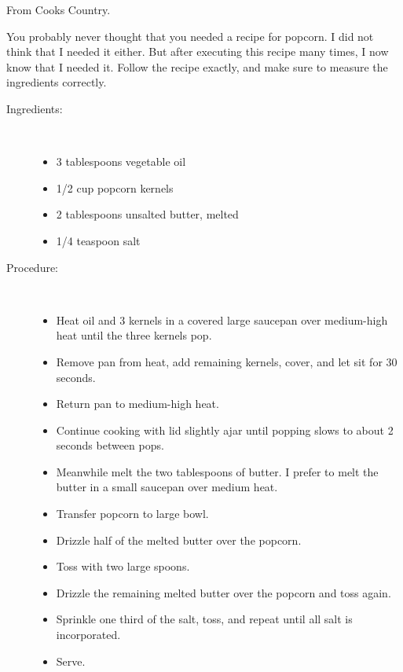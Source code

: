 \documentclass[11pt,letterpaper]{article}
\begin{document}


\begin{flushright}
{\hspace{4in} From Cooks Country.}
\end{flushright}
\vspace{0.5in}

You probably never thought that you needed a recipe for popcorn. I did not think that I needed it either. But after executing this recipe many times, I now know that I needed it. Follow the recipe exactly, and make sure to measure the ingredients correctly.


\begin{description}

\item[Ingredients:]\ \\
	\begin{itemize}
	\item	 3 tablespoons vegetable oil
	\item 1/2 cup popcorn kernels
	\item 2 tablespoons unsalted butter, melted
	\item 1/4  teaspoon salt
	\end{itemize}

\item[Procedure:]\ \\

	\begin{itemize}
	\item Heat oil and 3 kernels in a covered large saucepan over medium-high heat until the three kernels pop. 
	\item Remove pan from heat, add remaining kernels, cover, and let sit for 30 seconds.
	\item Return pan to medium-high heat. 
	\item Continue cooking with lid slightly ajar until popping slows to about 2 seconds between pops. 
	\item Meanwhile melt the two tablespoons of butter. I prefer to melt the butter in a small saucepan over medium heat. 
	\item Transfer popcorn to large bowl. 
	\item Drizzle half of the melted butter over the popcorn.
	\item Toss with two large spoons.
	\item  Drizzle the remaining melted butter over the popcorn and toss again.
	\item Sprinkle one third of the salt, toss, and repeat until all salt is incorporated.
	\item Serve.
	\end{itemize}
\end{description}
\end{document}
